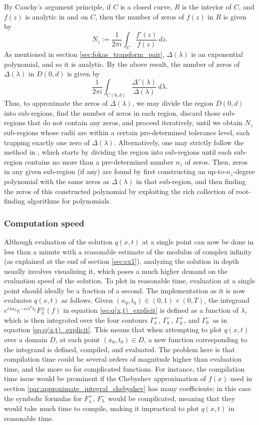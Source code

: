 \documentclass[12pt, oneside, a4paper]{article}
\begin{document}
By Cauchy's argument principle, if $C$ is a closed curve, $R$ is the interior of $C$, and $f(z)$ is analytic in and on $C$, then the number of zeros of $f(z)$ in $R$ is given by
\[N_z := \frac{1}{2\pi i}\int_C \frac{f'(z)}{f(z)}\,dz.\]
As mentioned in section \ref{sec:fokas_transform_pair}, $\Delta(\lambda)$ is an exponential polynomial, and so it is analytic. By the above result, the number of zeros of $\Delta(\lambda)$ in $D(0,d)$ is given by
\[\frac{1}{2\pi i}\int_{C(0,d)} \frac{\Delta'(\lambda)}{\Delta(\lambda)}\,d\lambda.\]
Thus, to approximate the zeros of $\Delta(\lambda)$, we may divide the region $D(0,d)$ into sub-regions, find the number of zeros in each region, discard those sub-regions that do not contain any zeros, and proceed iteratively, until we obtain $N_z$ sub-regions whose radii are within a certain pre-determined tolerance level, each trapping exactly one zero of $\Delta(\lambda)$. Alternatively, one may strictly follow the method in \cite{Delves1967}, which starts by dividing the region into sub-regions until each sub-region contains no more than a pre-determined number $n_z$ of zeros. Then, zeros in any given sub-region (if any) are found by first constructing an up-to-$n_z$-degree polynomial with the same zeros as $\Delta(\lambda)$ in that sub-region, and then finding the zeros of this constructed polynomial by exploiting the rich collection of root-finding algorithms for polynomials.

\subsubsection{Computation speed}

Although evaluation of the solution $q(x,t)$ at a single point can now be done in less than a minute with a reasonable estimate of the modulus of complex infinity (as explained at the end of section \ref{sec:ex1}), analyzing the solution in depth usually involves visualizing it, which poses a much higher demand on the evaluation speed of the solution. To plot in reasonable time, evaluation at a single point should ideally be a fraction of a second. The implementation as it is now evaluates $q(x,t)$ as follows. Given $(x_0, t_0)\in (0,1)\times (0,T)$, the integrand $e^{i\lambda x_0}e^{-\alpha \lambda^n t_0}F_\lambda^\pm(f)$ in equation \eqref{eq:q(x,t)_explicit} is defined as a function of $\lambda$, which is then integrated over the four contours $\Gamma_a^+$, $\Gamma_a^-$, $\Gamma_0^+$, and $\Gamma_0^-$ as in equation \eqref{eq:q(x,t)_explicit}. This means that when attempting to plot $q(x,t)$ over a domain $D$, at each point $(x_0, t_0)\in D$, a new function corresponding to the integrand is defined, compiled, and evaluated. The problem here is that compilation time could be several orders of magnitude higher than evaluation time, and the more so for complicated functions. For instance, the compilation time issue would be prominent if the Chebyshev approximation of $f(x)$ used in section \ref{par:approximate_integral_chebyshev} has many coefficients; in this case the symbolic formulas for $F_\lambda^+$, $F_\lambda^-$ would be complicated, meaning that they would take much time to compile, making it impractical to plot $q(x,t)$ in reasonable time.
\end{document}
